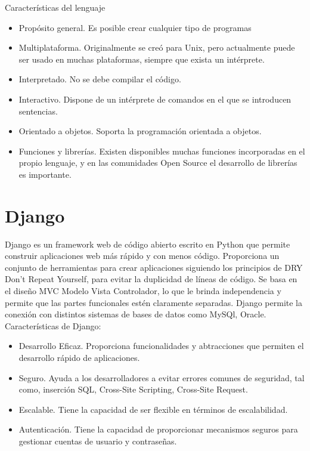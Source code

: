 \documentclass[a4paper, 12pt]{book}
\begin{document}
Características del lenguaje

\begin{itemize}
  \item Propósito general. Es posible crear cualquier tipo de programas
  \item Multiplataforma. Originalmente se creó para Unix, pero actualmente puede ser usado en
	muchas plataformas, siempre que exista un intérprete.
	\item Interpretado. No se debe compilar el código.
	\item Interactivo. Dispone de un intérprete de comandos en el que se introducen sentencias.
	\item Orientado a objetos. Soporta la programación orientada a objetos.
	\item Funciones y librerías. Existen disponibles muchas funciones incorporadas en el propio 
	lenguaje, y en las comunidades Open Source el desarrollo de librerías es importante.
\end{itemize}

\section{Django}
\label{sec:seccion5}

Django es un framework web de código abierto escrito en Python que permite construir aplicaciones
web más rápido y con menos código. Proporciona un conjunto de herramientas para crear aplicaciones
siguiendo los principios de DRY Don't Repeat Yourself, para evitar la duplicidad de líneas de código.
Se basa en el diseño MVC Modelo Vista Controlador, lo que le brinda independencia y permite que
las partes funcionales estén claramente separadas.
Django permite la conexión con distintos sistemas de bases de datos como MySQl, Oracle. \\

Características de Django:

\begin{itemize}
  \item Desarrollo Eficaz. Proporciona funcionalidades y abtracciones que permiten el desarrollo
	rápido de aplicaciones.
  \item Seguro. Ayuda a los desarrolladores a evitar errores comunes de seguridad, tal como, inserción 
	SQL, Cross-Site Scripting, Cross-Site Request.
	\item Escalable. Tiene la capacidad de ser flexible en términos de escalabilidad.
	\item Autenticación. Tiene la capacidad de proporcionar mecanismos seguros para gestionar cuentas
	de usuario y contraseñas.
\end{itemize}
\end{document}
